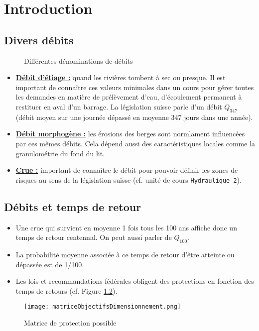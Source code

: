 \chapter{Introduction}

\section{Divers débits}
\begin{figure}[H]
    \centering
    \caption{Différentes dénominations de débits}
    \label{fig:debits}
\end{figure}

\begin{itemize}
    \item \underline{\textbf{Débit d'étiage :}} quand les rivières tombent à sec ou presque.
    Il est important de connaître ces valeurs minimales dans un cours pour gérer toutes les demandes en matière de prélèvement d'eau, d'écoulement permanent à restituer en aval d'un barrage.
    La législation suisse parle d'un débit $Q_{347}$ (débit moyen sur une journée dépassé en moyenne 347 jours dans une année).
    \item \underline{\textbf{Débit morphogène :}} les érosions des berges sont normlament influencées par ces mêmes débits. Cela dépend aussi des caractéristiques locales comme la granulométrie du fond du lit.
    \item \underline{\textbf{Crue :}} important de connaître le débit pour pouvoir définir les zones de risques au sens de la législation suisse (cf. unité de cours \texttt{Hydraulique 2}).
\end{itemize}

\section{Débits et temps de retour}
\begin{itemize}
    \item Une crue qui survient en moyenne 1 fois tous les 100 ans affiche donc un temps de retour centennal.
    On peut aussi parler de $Q_{100}$.
    \item La probabilité moyenne associée à ce temps de retour d'être atteinte ou dépassée est de 1/100.
    \item Les lois et recommandations fédérales obligent des protections en fonction des temps de retours (cf. Figure \ref{fig:matriceProtection}).
\end{itemize}
\begin{figure}[h!]
    \centering
    \texttt{[image: matriceObjectifsDimensionnement.png]}
    \caption{Matrice de protection possible}
    \label{fig:matriceProtection}
\end{figure}

